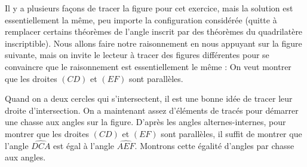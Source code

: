 \begin{sol}
Il y a plusieurs façons de tracer la figure pour cet exercice, mais la solution est essentiellement la même, peu importe la configuration considérée (quitte à remplacer certains théorèmes de l'angle inscrit par des théorèmes du quadrilatère inscriptible). Nous allons faire notre raisonnement en nous appuyant sur la figure suivante, mais on invite le lecteur à tracer des figures différentes pour se convaincre que le raisonnement est essentiellement le même :
\newline
On veut montrer que les droites $(CD)$ et $(EF)$ sont parallèles.

Quand on a deux cercles qui s'intersectent, il est une bonne idée de tracer leur droite d'intersection. On a maintenant assez d'éléments de tracés pour démarrer une chasse aux angles sur la figure.
\newline
D'après les angles alternes-internes, pour montrer que les droites $(CD)$ et $(EF)$ sont parallèles, il suffit de montrer que l'angle $\widehat{DCA}$ est égal à l'angle $\widehat{AEF}$. Montrons cette égalité d'angles par chasse aux angles.


\end{sol}

